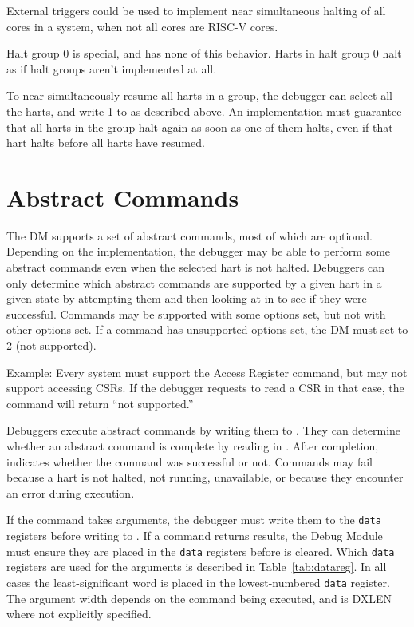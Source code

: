 \begin{commentary}
    External triggers could be used to implement near simultaneous halting of
    all cores in a system, when not all cores are RISC-V cores.
\end{commentary}

Halt group 0 is special, and has none of this behavior. Harts in halt group 0
halt as if halt groups aren't implemented at all.

To near simultaneously resume all harts in a group, the debugger can select all
the harts, and write 1 to \Fresumereq as described above. An implementation
must guarantee that all harts in the group halt again as soon as one of them
halts, even if that hart halts before all harts have resumed.

\section{Abstract Commands} \label{abstractcommands}

The DM supports a set of abstract commands, most of which
are optional. Depending on the implementation, the debugger may
be able to perform
some abstract commands even when the selected hart is not halted.
Debuggers can only determine which abstract commands
are supported by a given hart in a given state by attempting them
and then looking at \Fcmderr in \Rabstractcs to see if they were successful.
Commands may be supported with some options set, but not with other options
set. If a command has unsupported options set, the DM must set \Fcmderr to 2
(not supported).

\begin{commentary}
    Example: Every system must support the Access Register command, but may not
    support accessing CSRs. If the debugger requests to read a CSR in that
    case, the command will return ``not supported.''
\end{commentary}

Debuggers execute abstract commands by writing them to \Rcommand.  They
can determine whether an abstract command is complete by reading \Fbusy in
\Rabstractcs. After completion, \Fcmderr indicates whether the command was
successful or not. Commands may fail because a hart is not halted, not running,
unavailable, or because they encounter an error during execution.

If the command takes arguments, the debugger
must write them to the {\tt data} registers before writing to \Rcommand. If a
command returns results, the Debug Module must ensure they are placed
in the {\tt data} registers before \Fbusy is cleared.
Which {\tt data} registers are used for the arguments is
described in Table~\ref{tab:datareg}.  In all cases the least-significant word
is placed in the lowest-numbered {\tt data} register. The argument width
depends on the command being executed, and is DXLEN where not explicitly
specified.

